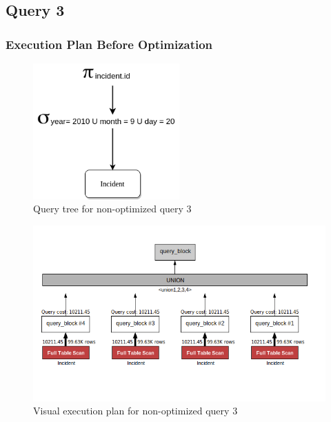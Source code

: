 \subsection{Query 3}

\subsubsection{Execution Plan Before Optimization}
\begin{figure}[H]
    \centering
    \includegraphics[width=0.5\textwidth]{images/query_trees/query3-optimized-and-non-optimized.png}
    \caption{Query tree for non-optimized query 3}
\end{figure}
\begin{figure}[H]
    \centering
    \includegraphics[width=\textwidth]{images/execution_plans/q3-1-old.png}
    \caption{Visual execution plan for non-optimized query 3}
\end{figure}

